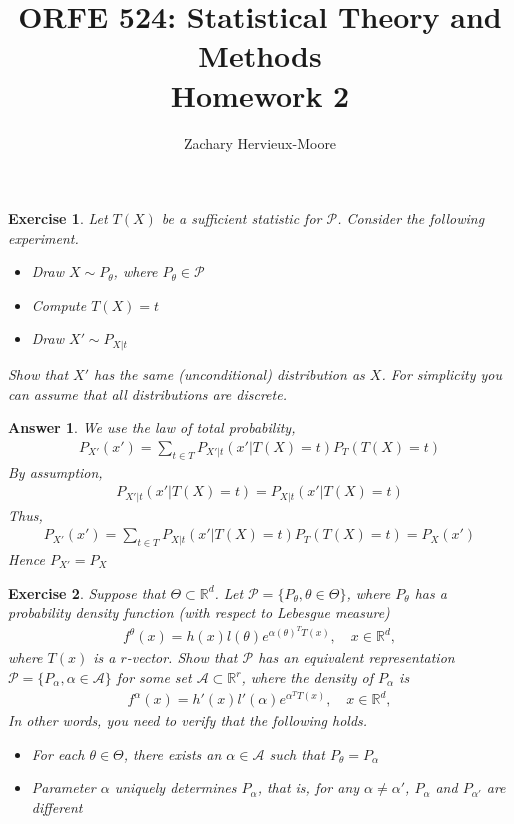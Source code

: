 \documentclass[12pt]{article}
\title{ORFE 524: Statistical Theory and Methods \\ Homework 2}
\author{Zachary Hervieux-Moore}
\date{\displaydate{date}}
\theoremstyle{colon}
\newtheorem{exercise}{Exercise}
\newtheorem*{answer}{Answer}
\begin{document}
\maketitle

\clearpage

\begin{exercise}
  Let $T(X)$ be a sufficient statistic for $\mathcal{P}$. Consider the following experiment.

  \begin{itemize}
    \item Draw $X \sim P_\theta$, where $P_\theta \in \mathcal{P}$
    \item Compute $T(X) = t$
    \item Draw $X' \sim P_{X|t}$
  \end{itemize}
  Show that $X'$ has the same (unconditional) distribution as $X$. For simplicity you can assume that all distributions are discrete.
\end{exercise}

\begin{answer}
  We use the law of total probability,
  \begin{gather*}
    P_{X'}(x') = \sum_{t \in T} P_{X' | t}(x' | T(X) = t) P_T(T(X) = t)
  \end{gather*}
  By assumption,
  \begin{gather*}
    P_{X' | t}(x' | T(X) = t) = P_{X | t}(x' | T(X) = t)
  \end{gather*}
  Thus,
  \begin{gather*}
    P_{X'}(x') = \sum_{t \in T} P_{X | t}(x' | T(X) = t) P_T(T(X) = t) = P_X(x')
  \end{gather*}
  Hence $P_{X'} = P_X$
\end{answer}

\clearpage

\begin{exercise}
  Suppose that $\Theta \subset \mathbb{R}^d$. Let $\mathcal{P} = \{ P_\theta, \theta \in \Theta \}$, where $P_\theta$ has a probability density function (with respect to Lebesgue measure)
  \begin{gather*}
    f^\theta(x) = h(x)l(\theta)e^{\alpha(\theta)^T T(x)}, \quad x \in \mathbb{R}^d,
  \end{gather*}
  where $T(x)$ is a $r$-vector. Show that $\mathcal{P}$ has an equivalent representation $\mathcal{P} = \{ P_\alpha, \alpha \in \mathcal{A}\}$ for some set $\mathcal{A} \subset \mathbb{R}^r$, where the density of $P_\alpha$ is
  \begin{gather*}
    f^\alpha(x) = h'(x)l'(\alpha)e^{\alpha^T T(x)}, \quad x \in \mathbb{R}^d,
  \end{gather*}
  In other words, you need to verify that the following holds.
  \begin{itemize}
    \item For each $\theta \in \Theta$, there exists an $\alpha \in \mathcal{A}$ such that $P_\theta = P_\alpha$
    \item Parameter $\alpha$ uniquely determines $P_\alpha$, that is, for any $\alpha \neq \alpha'$, $P_\alpha$ and $P_{\alpha'}$ are different
  \end{itemize}
\end{exercise}
\end{document}
